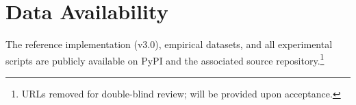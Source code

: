 \documentclass[12pt]{article}
\theoremstyle{definition}
\theoremstyle{remark}
\begin{document}
\section*{Data Availability}

The reference implementation (v3.0), empirical datasets, and all experimental scripts are publicly available on PyPI and the associated source repository.\footnote{URLs removed for double-blind review; will be provided upon acceptance.}


\end{document}
